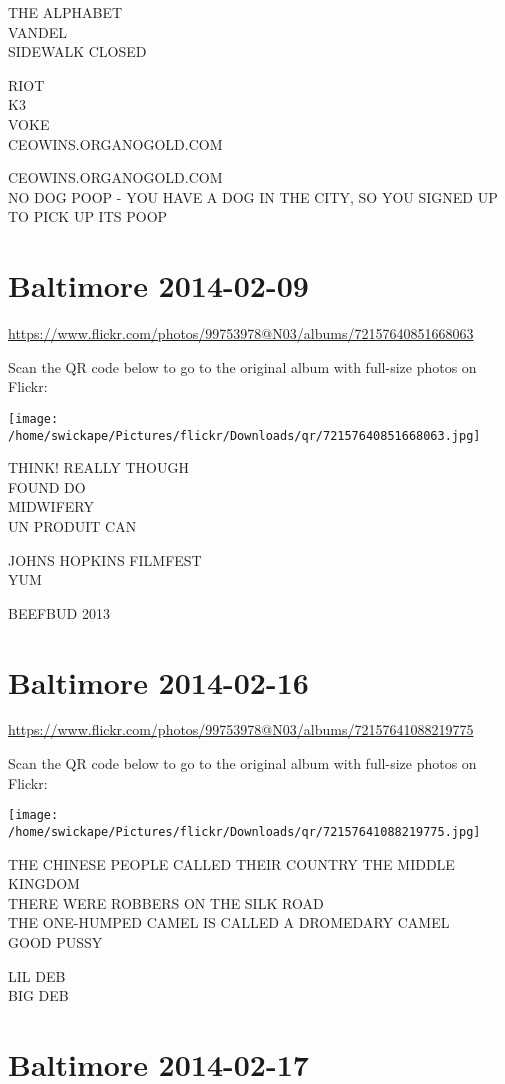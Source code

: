 \documentclass[10pt,letterpaper]{article}
\begin{document}
THE ALPHABET\\
VANDEL\\
SIDEWALK CLOSED

RIOT\\
K3\\
VOKE\\
CEOWINS.ORGANOGOLD.COM

CEOWINS.ORGANOGOLD.COM\\
NO DOG POOP {-} YOU HAVE A DOG IN THE CITY, SO YOU SIGNED UP TO PICK UP ITS POOP


\section*{Baltimore 2014-02-09}

\url{https://www.flickr.com/photos/99753978@N03/albums/72157640851668063}

Scan the QR code below to go to the original album with full-size photos on Flickr:

\texttt{[image: /home/swickape/Pictures/flickr/Downloads/qr/72157640851668063.jpg]}


THINK!  REALLY THOUGH\\
FOUND DO\\
MIDWIFERY\\
UN PRODUIT CAN

JOHNS HOPKINS FILMFEST\\
YUM

BEEFBUD 2013


\section*{Baltimore 2014-02-16}

\url{https://www.flickr.com/photos/99753978@N03/albums/72157641088219775}

Scan the QR code below to go to the original album with full-size photos on Flickr:

\texttt{[image: /home/swickape/Pictures/flickr/Downloads/qr/72157641088219775.jpg]}


THE CHINESE PEOPLE CALLED THEIR COUNTRY THE MIDDLE KINGDOM\\
THERE WERE ROBBERS ON THE SILK ROAD\\
THE ONE{-}HUMPED CAMEL IS CALLED A DROMEDARY CAMEL\\
GOOD PUSSY

LIL DEB\\
BIG DEB


\section*{Baltimore 2014-02-17}
\end{document}
